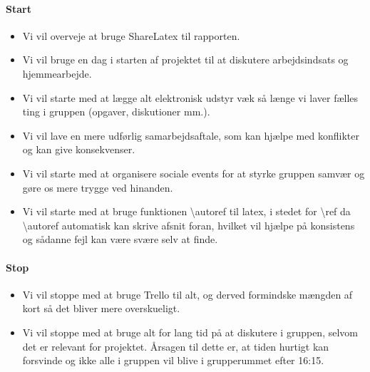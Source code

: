 \documentclass[oneside,a4paper,titlepage]{article}
\begin{document}
\paragraph{Start}
\begin{itemize}
  \item Vi vil overveje at bruge ShareLatex til rapporten. 
  \item Vi vil bruge en dag i starten af projektet til at diskutere arbejdsindsats og hjemmearbejde. 
  \item Vi vil starte med at lægge alt elektronisk udstyr væk så længe vi laver fælles ting i gruppen (opgaver, diskutioner mm.).
  \item Vi vil lave en mere udførlig samarbejdsaftale, som kan hjælpe med konflikter og kan give konsekvenser. 
  \item Vi vil starte med at organisere sociale events for at styrke gruppen samvær og gøre os mere trygge ved hinanden.
  \item Vi vil starte med at bruge funktionen \textbackslash autoref til latex, i stedet for \textbackslash ref da \textbackslash autoref automatisk kan skrive afsnit foran, hvilket vil hjælpe på konsistens og sådanne fejl kan være svære selv at finde.
\end{itemize}

\paragraph{Stop}
\begin{itemize}
  \item Vi vil stoppe med at bruge Trello til alt, og derved formindske mængden af kort så det bliver mere overskueligt.
  \item Vi vil stoppe med at bruge alt for lang tid på at diskutere i gruppen, selvom det er relevant for projektet. Årsagen til dette er, at tiden hurtigt kan forsvinde og ikke alle i gruppen vil blive i grupperummet efter 16:15.
\end{itemize}
\end{document}
